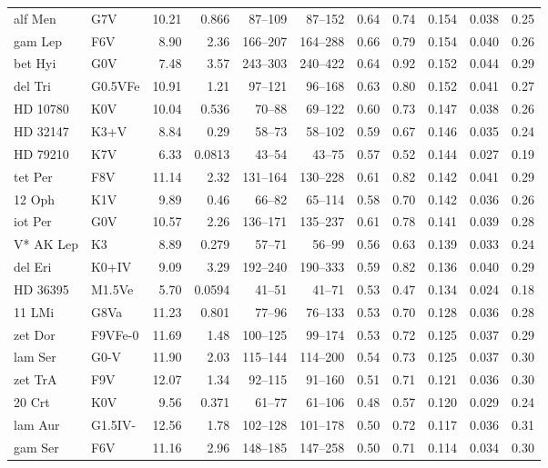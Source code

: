 \documentclass[11pt,a4paper]{article}
\begin{document}
{\begin{longtable}{llrrrrrrrrr}
alf Men & G7V & 10.21 & 0.866 & 87--109 & 87--152 & 0.64 & 0.74 & 0.154 & 0.038 & 0.25 \\
gam Lep & F6V & 8.90 & 2.36 & 166--207 & 164--288 & 0.66 & 0.79 & 0.154 & 0.040 & 0.26 \\
bet Hyi & G0V & 7.48 & 3.57 & 243--303 & 240--422 & 0.64 & 0.92 & 0.152 & 0.044 & 0.29 \\
del Tri & G0.5VFe & 10.91 & 1.21 & 97--121 & 96--168 & 0.63 & 0.80 & 0.152 & 0.041 & 0.27 \\
HD  10780 & K0V & 10.04 & 0.536 & 70--88 & 69--122 & 0.60 & 0.73 & 0.147 & 0.038 & 0.26 \\
HD  32147 & K3+V & 8.84 & 0.29 & 58--73 & 58--102 & 0.59 & 0.67 & 0.146 & 0.035 & 0.24 \\
HD  79210 & K7V & 6.33 & 0.0813 & 43--54 & 43--75 & 0.57 & 0.52 & 0.144 & 0.027 & 0.19 \\
tet Per & F8V & 11.14 & 2.32 & 131--164 & 130--228 & 0.61 & 0.82 & 0.142 & 0.041 & 0.29 \\
12 Oph & K1V & 9.89 & 0.46 & 66--82 & 65--114 & 0.58 & 0.70 & 0.142 & 0.036 & 0.26 \\
iot Per & G0V & 10.57 & 2.26 & 136--171 & 135--237 & 0.61 & 0.78 & 0.141 & 0.039 & 0.28 \\
V* AK Lep & K3 & 8.89 & 0.279 & 57--71 & 56--99 & 0.56 & 0.63 & 0.139 & 0.033 & 0.24 \\
del Eri & K0+IV & 9.09 & 3.29 & 192--240 & 190--333 & 0.59 & 0.82 & 0.136 & 0.040 & 0.29 \\
HD  36395 & M1.5Ve & 5.70 & 0.0594 & 41--51 & 41--71 & 0.53 & 0.47 & 0.134 & 0.024 & 0.18 \\
11 LMi & G8Va & 11.23 & 0.801 & 77--96 & 76--133 & 0.53 & 0.70 & 0.128 & 0.036 & 0.28 \\
zet Dor & F9VFe-0 & 11.69 & 1.48 & 100--125 & 99--174 & 0.53 & 0.72 & 0.125 & 0.037 & 0.29 \\
lam Ser & G0-V & 11.90 & 2.03 & 115--144 & 114--200 & 0.54 & 0.73 & 0.125 & 0.037 & 0.30 \\
zet TrA & F9V & 12.07 & 1.34 & 92--115 & 91--160 & 0.51 & 0.71 & 0.121 & 0.036 & 0.30 \\
20 Crt & K0V & 9.56 & 0.371 & 61--77 & 61--106 & 0.48 & 0.57 & 0.120 & 0.029 & 0.24 \\
lam Aur & G1.5IV- & 12.56 & 1.78 & 102--128 & 101--178 & 0.50 & 0.72 & 0.117 & 0.036 & 0.31 \\
gam Ser & F6V & 11.16 & 2.96 & 148--185 & 147--258 & 0.50 & 0.71 & 0.114 & 0.034 & 0.30 \\

\end{longtable}}
\end{document}
